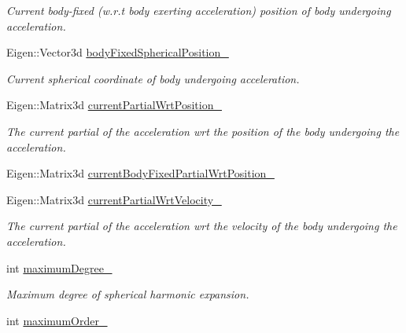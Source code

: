 \begin{DoxyCompactItemize}
\begin{DoxyCompactList}\small\item\em Current body-\/fixed (w.\+r.\+t body exerting acceleration) position of body undergoing acceleration. \end{DoxyCompactList}\item 
Eigen\+::\+Vector3d \hyperlink{classtudat_1_1acceleration__partials_1_1SphericalHarmonicsGravityPartial_a82865216494957a337867dd7c05d8ce1}{body\+Fixed\+Spherical\+Position\+\_\+}
\begin{DoxyCompactList}\small\item\em Current spherical coordinate of body undergoing acceleration. \end{DoxyCompactList}\item 
Eigen\+::\+Matrix3d \hyperlink{classtudat_1_1acceleration__partials_1_1SphericalHarmonicsGravityPartial_a41f5854f618449f734d9e385bb929778}{current\+Partial\+Wrt\+Position\+\_\+}
\begin{DoxyCompactList}\small\item\em The current partial of the acceleration wrt the position of the body undergoing the acceleration. \end{DoxyCompactList}\item 
Eigen\+::\+Matrix3d \hyperlink{classtudat_1_1acceleration__partials_1_1SphericalHarmonicsGravityPartial_a7a9f8f2be401442d321d9d16ea677beb}{current\+Body\+Fixed\+Partial\+Wrt\+Position\+\_\+}
\item 
Eigen\+::\+Matrix3d \hyperlink{classtudat_1_1acceleration__partials_1_1SphericalHarmonicsGravityPartial_a350f32e79d02ae83d780222a504c2192}{current\+Partial\+Wrt\+Velocity\+\_\+}
\begin{DoxyCompactList}\small\item\em The current partial of the acceleration wrt the velocity of the body undergoing the acceleration. \end{DoxyCompactList}\item 
int \hyperlink{classtudat_1_1acceleration__partials_1_1SphericalHarmonicsGravityPartial_ac8a5875d6c430cf8c197b4dbd13e4c58}{maximum\+Degree\+\_\+}
\begin{DoxyCompactList}\small\item\em Maximum degree of spherical harmonic expansion. \end{DoxyCompactList}\item 
int \hyperlink{classtudat_1_1acceleration__partials_1_1SphericalHarmonicsGravityPartial_a6d7ad24c3d1f2c8faaa861206872c822}{maximum\+Order\+\_\+}

\end{DoxyCompactItemize}
